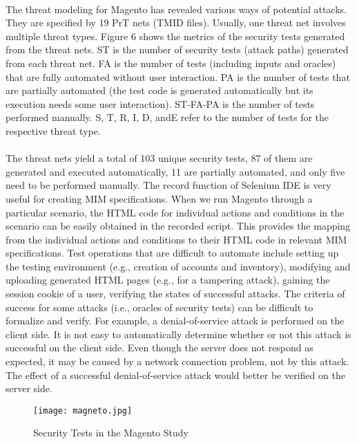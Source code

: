 \paragraph*{}
The threat modeling for Magento has revealed various
ways of potential attacks. They are specified by 19 PrT nets
(TMID files). Usually, one threat net involves multiple threat
types. Figure 6 shows the metrics of the security tests
generated from the threat nets. ST is the number of security
tests (attack paths) generated from each threat net. FA is the
number of tests (including inputs and oracles) that are fully
automated without user interaction. PA is the number of
tests that are partially automated (the test code is generated
automatically but its execution needs some user interaction).
ST-FA-PA is the number of tests performed manually. S, T, R,
I, D, andE refer to the number of tests for the respective threat
type.
\paragraph*{} The threat nets yield a total of 103 unique security tests,
87 of them are generated and executed automatically, 11 are
partially automated, and only five need to be performed
manually. The record function of Selenium IDE is very useful
for creating MIM specifications. When we run Magento
through a particular scenario, the HTML code for individual
actions and conditions in the scenario can be easily obtained
in the recorded script. This provides the mapping from the
individual actions and conditions to their HTML code in
relevant MIM specifications. Test operations that are difficult
to automate include setting up the testing environment (e.g.,
creation of accounts and inventory), modifying and uploading
generated HTML pages (e.g., for a tampering attack),
gaining the session cookie of a user, verifying the states of
successful attacks. The criteria of success for some attacks
(i.e., oracles of security tests) can be difficult to formalize and
verify. For example, a denial-of-service attack is performed on the client side. It is not easy to automatically determine whether or not this attack is successful on the client side. Even though the server does not respond as expected, it may be
caused by a network connection problem, not by this attack.
The effect of a successful denial-of-service attack would
better be verified on the server side.
\begin{figure}
\centering
\texttt{[image: magneto.jpg]}
\caption{Security Tests in the Magento Study}
\label{fig:figure 6}
\end{figure}
